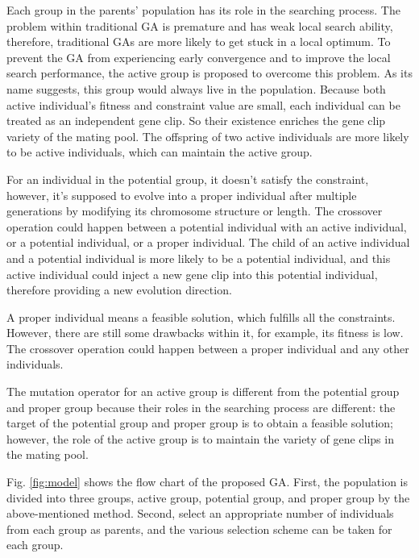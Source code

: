 \documentclass[10pt, journal]{IEEEtran}
\begin{document}
Each group in the parents' population has its role in the searching
process. The problem within traditional GA is premature and has weak local
search ability, therefore, traditional GAs are more likely to get stuck in a
local optimum. To prevent the GA from experiencing early convergence and to
improve the local search performance, the active group is proposed to overcome
this problem. As its name suggests, this group would always live in the
population.  Because both active individual's fitness and constraint value are small,
each individual can be treated as an independent gene clip. So their existence
enriches the gene clip variety of the mating pool. The offspring of two active
individuals are more likely to be active individuals, which can maintain the
active group.

For an individual in the potential group, it doesn't satisfy the constraint,
however, it's supposed to evolve into a proper individual after multiple
generations by modifying its chromosome structure or length. The crossover
operation could happen between a potential individual with an active
individual, or a potential individual, or a proper individual. The child of an
active individual and a potential individual is more likely to be a potential individual,
and this active individual could inject a new gene clip into this potential
individual, therefore providing a new evolution direction. 


A proper individual means a feasible solution, which fulfills all the constraints. 
However, there are still some drawbacks within it, for example, its fitness is low.
The crossover operation could happen between a proper individual and any other individuals.


The mutation operator for an active group is different from the potential group
and proper group because their roles in the searching process are different:
the target of the potential group and proper group is to obtain a feasible
solution; however, the role of the active group is to maintain the variety of gene
clips in the mating pool. 

Fig. \ref{fig:model} shows the flow chart of the proposed GA. First, the
population is divided into three groups, active group, potential group, and
proper group by the above-mentioned method. Second, select an appropriate number of
individuals from each group as parents, and the various selection scheme can be
taken for each group. 
\end{document}
